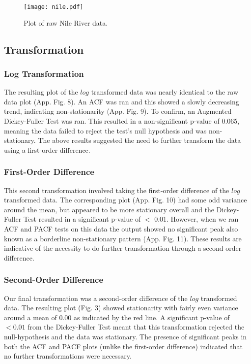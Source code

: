 \documentclass{article}
\begin{document}
\begin{figure}[H]
\begin{center}
\texttt{[image: nile.pdf]}
\caption{Plot of raw Nile River data.}
\end{center}
\end{figure}

\subsection{Transformation}
\subsubsection{Log Transformation}
The resulting plot of the $log$ transformed data was nearly identical to the raw data plot (App. Fig. 8). An ACF was ran and this showed a slowly decreasing trend, indicating non-stationarity (App. Fig. 9). To confirm, an Augmented Dickey-Fuller Test was ran. This resulted in a non-significant p-value of 0.065, meaning the data failed to reject the test's null hypothesis and was non-stationary. The above results suggested the need to further transform the data using a first-order difference. 

\subsubsection{First-Order Difference}
This second transformation involved taking the first-order difference of the $log$ transformed data. The corresponding plot (App. Fig. 10) had some odd variance around the mean, but appeared to be more stationary overall and the Dickey-Fuller Test resulted in a significant p-value of $<$ 0.01. However, when we ran ACF and PACF tests on this data the output showed no significant peak also known as a borderline non-stationary pattern (App. Fig. 11). These results are indicative of the necessity to do further transformation through a second-order difference. 

\subsubsection{Second-Order Difference}
Our final transformation was a second-order difference of the $log$ transformed data. The resulting plot (Fig. 3) showed stationarity with fairly even variance around a mean of 0.00 as indicated by the red line. A significant p-value of $< 0.01$ from the Dickey-Fuller Test meant that this transformation rejected the null-hypothesis and the data was stationary. The presence of significant peaks in both the ACF and PACF plots (unlike the first-order difference) indicated that no further transformations were necessary. 
\end{document}
